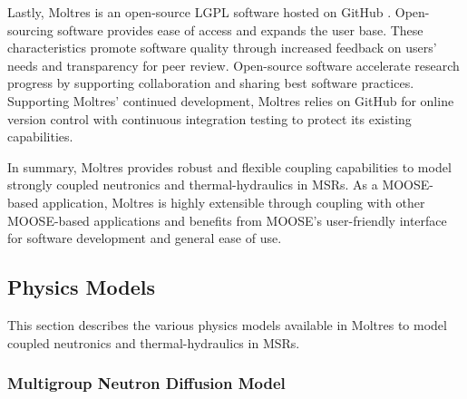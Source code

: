 Lastly, Moltres is an open-source \gls{LGPL} software hosted on
GitHub \cite{github_build_2017}. Open-sourcing software provides ease of access
and expands the user base. These characteristics promote software quality
through increased feedback on users' needs and transparency for peer review.
Open-source software accelerate research progress by supporting
collaboration and sharing best software practices. Supporting Moltres'
continued development, Moltres relies on GitHub for online version control with
continuous integration testing to protect its existing capabilities.

In summary, Moltres provides robust and flexible coupling capabilities to
model strongly coupled neutronics and thermal-hydraulics in \glspl{MSR}. As a
MOOSE-based application, Moltres is highly extensible through coupling with
other MOOSE-based applications and benefits from MOOSE's user-friendly
interface for software development and general ease of use.

\subsection{Physics Models} \label{sec:moltres-physics}

This section describes the various physics models available in Moltres to model
coupled neutronics and thermal-hydraulics in \glspl{MSR}.

\subsubsection{Multigroup Neutron Diffusion Model} \label{sec:nts}

